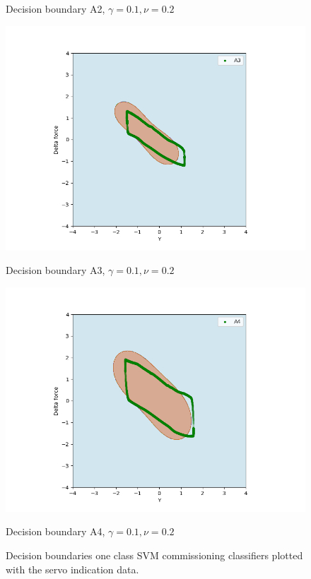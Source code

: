 \begin{figure}[]
\begin{minipage}[b]{0.5\linewidth}
                    \caption*{Decision boundary A2, $\gamma = 0.1, \nu = 0.2$}
                \end{minipage}
                \hfill
                \begin{minipage}[b]{0.5\linewidth}
                    \centering
                    \includegraphics[width = \textwidth]{figures/analysis/one_class_startup/SVM_OC_startup_no_servo_g02_nu01_A3.png}
                    \caption*{Decision boundary A3, $\gamma = 0.1, \nu = 0.2$}
                \end{minipage}
                \hfill
                \begin{minipage}[b]{0.5\linewidth}
                    \centering
                    \includegraphics[width = \textwidth]{figures/analysis/one_class_startup/SVM_OC_startup_no_servo_g02_nu01_A4.png}
                    \caption*{Decision boundary A4, $\gamma = 0.1, \nu = 0.2$}
                \end{minipage}
                \hfill
                \caption{Decision boundaries one class SVM commissioning classifiers plotted with the servo indication data.}
                \label{fig:one_svm_servo}
            \end{figure}
            
